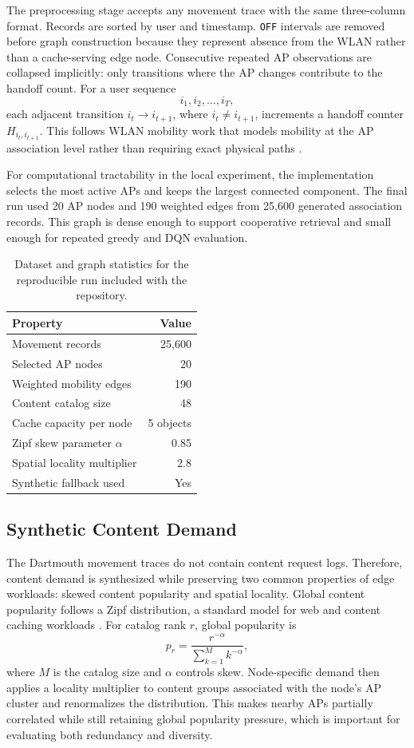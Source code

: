 The preprocessing stage accepts any movement trace with the same three-column format. Records are sorted by user and timestamp. \texttt{OFF} intervals are removed before graph construction because they represent absence from the WLAN rather than a cache-serving edge node. Consecutive repeated AP observations are collapsed implicitly: only transitions where the AP changes contribute to the handoff count. For a user sequence
\[
i_1, i_2, \ldots, i_T,
\]
each adjacent transition \(i_t \rightarrow i_{t+1}\), where \(i_t \neq i_{t+1}\), increments a handoff counter \(H_{i_t,i_{t+1}}\). This follows WLAN mobility work that models mobility at the AP association level rather than requiring exact physical paths \cite{kim2005mobility_wifi_ap,shin2004neighbor_graphs}.

For computational tractability in the local experiment, the implementation selects the most active APs and keeps the largest connected component. The final run used 20 AP nodes and 190 weighted edges from 25,600 generated association records. This graph is dense enough to support cooperative retrieval and small enough for repeated greedy and DQN evaluation.

\begin{table}[t]
\centering
\caption{Dataset and graph statistics for the reproducible run included with the repository.}
\label{tab:dataset_stats}
\begin{tabular}{lr}
\toprule
Property & Value \\
\midrule
Movement records & 25,600 \\
Selected AP nodes & 20 \\
Weighted mobility edges & 190 \\
Content catalog size & 48 \\
Cache capacity per node & 5 objects \\
Zipf skew parameter \(\alpha\) & 0.85 \\
Spatial locality multiplier & 2.8 \\
Synthetic fallback used & Yes \\
\bottomrule
\end{tabular}
\end{table}

\subsection{Synthetic Content Demand}

The Dartmouth movement traces do not contain content request logs. Therefore, content demand is synthesized while preserving two common properties of edge workloads: skewed content popularity and spatial locality. Global content popularity follows a Zipf distribution, a standard model for web and content caching workloads \cite{breslau1999zipf,Podlipnig2003}. For catalog rank \(r\), global popularity is
\[
p_r = \frac{r^{-\alpha}}{\sum_{k=1}^{M} k^{-\alpha}},
\]
where \(M\) is the catalog size and \(\alpha\) controls skew. Node-specific demand then applies a locality multiplier to content groups associated with the node's AP cluster and renormalizes the distribution. This makes nearby APs partially correlated while still retaining global popularity pressure, which is important for evaluating both redundancy and diversity.

